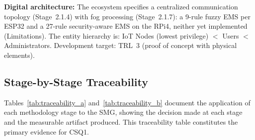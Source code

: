 \documentclass[preprint,12pt,authoryear]{elsarticle}
\begin{document}
\textbf{Digital architecture:} The ecosystem specifies a centralized communication topology (Stage~2.1.4) with fog processing (Stage~2.1.7): a 9-rule fuzzy EMS per ESP32 and a 27-rule security-aware EMS on the RPi4, neither yet implemented (Limitations). The entity hierarchy is: IoT Nodes (lowest privilege) $<$ Users $<$ Administrators. Development target: TRL~3 (proof of concept with physical elements).

\subsection{Stage-by-Stage Traceability}

Tables~\ref{tab:traceability_a} and~\ref{tab:traceability_b} document the application of each methodology stage to the SMG, showing the decision made at each stage and the measurable artifact produced. This traceability table constitutes the primary evidence for CSQ1.
\end{document}
